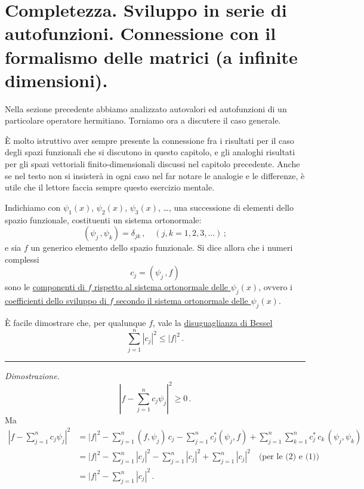 \documentclass[11pt, a4paper]{book}
\numberwithin{equation}{section}
\begin{document}
\section{Completezza. Sviluppo in serie di autofunzioni. Connessione con il formalismo delle matrici (a infinite dimensioni).}

Nella sezione precedente abbiamo analizzato autovalori ed autofunzioni di un particolare operatore hermitiano. Torniamo ora a discutere il caso generale.

È molto istruttivo aver sempre presente la connessione fra i risultati per il caso degli spazi funzionali che si discutono in questo capitolo, e gli analoghi risultati per gli spazi vettoriali finito-dimensionali discussi nel capitolo precedente. Anche se nel testo non si insisterà in ogni caso nel far notare le analogie e le differenze, è utile che il lettore faccia sempre questo esercizio mentale.

Indichiamo con $\psi_1(x)$, $\psi_2(x)$, $\psi_3(x)$, \ldots, una successione di elementi dello spazio funzionale, costituenti un sistema ortonormale:
\begin{equation}
(\psi_j\,,\psi_k)=\delta_{jk}\,,\quad (j,k=1,2,3,\ldots)\,;
\end{equation}
e sia $f$ un generico elemento dello spazio funzionale. Si dice allora che i numeri complessi
\begin{equation}
c_j=(\psi_j\,,f)
\end{equation}
sono le \underline{componenti di $f$ rispetto al sistema ortonormale delle $\psi_j(x)$}, ovvero i \underline{coefficienti dello sviluppo di $f$ secondo il sistema ortonormale delle $\psi_j(x)$}.

È facile dimostrare che, per qualunque $f$, vale la \underline{disuguaglianza di Bessel}
\begin{equation}
\sum_{j=1}^{n}|c_j|^2 \leq |f|^2\,.
\end{equation}

\hrule
\medskip
\noindent\textit{Dimostrazione.}
\[
\left|f-\sum_{j=1}^{n}c_j\psi_j\right|^2\geq 0\,.
\]
Ma
\begin{align*}
\left|f-\sum_{j=1}^{n}c_j\psi_j\right|^2
&= |f|^2
  -\sum_{j=1}^{n}(f,\psi_j)\,c_j
  -\sum_{j=1}^{n}c_j^*(\psi_j,f)
  +\sum_{j=1}^{n}\sum_{k=1}^{n}c_j^*\,c_k\,(\psi_j,\psi_k) \\
&= |f|^2-\sum_{j=1}^{n}|c_j|^2-\sum_{j=1}^{n}|c_j|^2+\sum_{j=1}^{n}|c_j|^2
   \quad\text{(per le (2) e (1))}\\
&= |f|^2-\sum_{j=1}^{n}|c_j|^2\,.
\end{align*}
\end{document}
